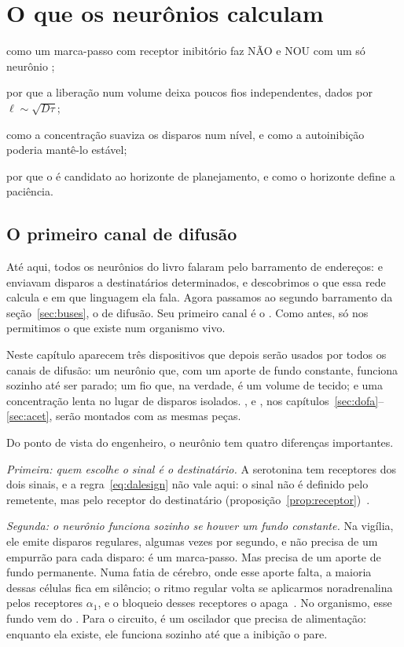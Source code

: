 \chapter{O que os neurônios  calculam}
\label{sec:serocomputer}
\begin{chaptergoals}
\item como um marca-passo com receptor inibitório faz NÃO e NOU com um só neurônio ;
\item por que a liberação num volume deixa poucos fios independentes, dados por $\ell\sim\sqrt{D\tau}$;
\item como a concentração suaviza os disparos num nível, e como a autoinibição poderia mantê-lo estável;
\item por que o  é candidato ao horizonte de planejamento, e como o horizonte define a paciência.
\end{chaptergoals}

\section{O primeiro canal de difusão}

Até aqui, todos os neurônios do livro falaram pelo barramento de endereços:  e  enviavam disparos a destinatários determinados, e descobrimos o que essa rede calcula e em que linguagem ela fala. Agora passamos ao segundo barramento da seção~\ref{sec:buses}, o de difusão. Seu primeiro canal é o . Como antes, só nos permitimos o que existe num organismo vivo.

Neste capítulo aparecem três dispositivos que depois serão usados por todos os canais de difusão: um neurônio que, com um aporte de fundo constante, funciona sozinho até ser parado; um fio que, na verdade, é um volume de tecido; e uma concentração lenta no lugar de disparos isolados. ,  e , nos capítulos~\ref{sec:dofa}--\ref{sec:acet}, serão montados com as mesmas peças.

Do ponto de vista do engenheiro, o neurônio  tem quatro diferenças importantes.

\emph{Primeira: quem escolhe o sinal é o destinatário.} A serotonina tem receptores dos dois sinais, e a regra~\eqref{eq:dalesign} não vale aqui: o sinal não é definido pelo remetente, mas pelo receptor do destinatário (proposição~\ref{prop:receptor})~\cite{BarnesSharp1999}.

\emph{Segunda: o neurônio  funciona sozinho se houver um fundo constante.} Na vigília, ele emite disparos regulares, algumas vezes por segundo, e não precisa de um empurrão para cada disparo: é um marca-passo. Mas precisa de um aporte de fundo permanente. Numa fatia de cérebro, onde esse aporte falta, a maioria dessas células fica em silêncio; o ritmo regular volta se aplicarmos noradrenalina pelos receptores $\alpha_1$, e o bloqueio desses receptores o apaga~\cite{VandermaelenAghajanian1983}. No organismo, esse fundo vem do . Para o circuito, é um oscilador que precisa de alimentação: enquanto ela existe, ele funciona sozinho até que a inibição o pare.

